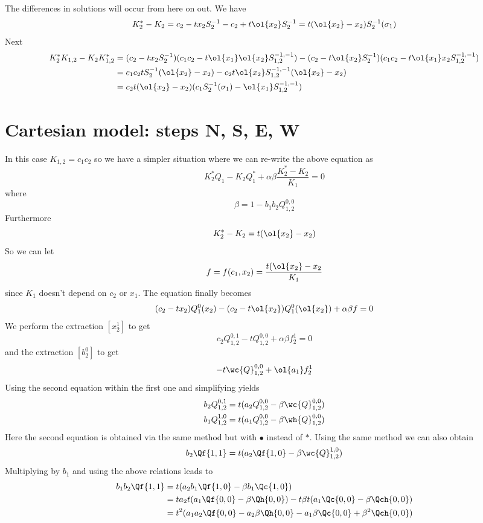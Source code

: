 The differences in solutions will occur from here on out. We have
\begin{align*}
	K_2^\ast - K_2 = c_2 - tx_2 S_2^{-1}-c_2+t\ol{x_2}S_2^{-1} = t(\ol{x_2}-x_2)S_2^{-1}(\sigma_1)
\end{align*}
Next
\begin{align*}
	K_2^\ast K_{1,2}- K_2 K_{1,2}^\ast &= (c_2-tx_2S_2^{-1})(c_1c_2-t\ol{x_1}\ol{x_2}S_{1,2}^{-1,-1})-(c_2-t\ol{x_2}S_2^{-1})(c_1c_2-t\ol{x_1}x_2S_{1,2}^{-1,-1})\\
	&=c_1c_2tS_2^{-1}(\ol{x_2}-x_2) - c_2t\ol{x_2}S_{1,2}^{-1,-1}(\ol{x_2}-x_2)\\
	&=c_2t(\ol{x_2}-x_2)(c_1S_2^{-1}(\sigma_1)-\ol{x_1}S_{1,2}^{-1,-1})
\end{align*}
\section{Cartesian model: steps N, S, E, W}
In this case $K_{1,2}= c_1c_2$ so we have a simpler situation where we can re-write the above equation as
\[
	K_2^\ast Q_1 - K_2 Q_1^\ast +\alpha\beta \frac{K_2^\ast - K_2}{K_1} = 0
\]
where
\[
	\beta = 1 - b_1b_2 Q_{1,2}^{0,0}
\]
Furthermore
\[
	K_2^\ast - K_2 = t(\ol{x_2}-x_2)
\]
So we can let
\[
	f = f(c_1,x_2) = \frac{t(\ol{x_2}-x_2}{K_1}
\]
since $K_1$ doesn't depend on $c_2$ or $x_1$. The equation finally becomes
\[
	(c_2-tx_2)Q_1^0(x_2) - (c_2-t\ol{x_2})Q_1^0(\ol{x_2}) + \alpha\beta f = 0
\]
We perform the extraction $[x_2^1]$ to get
\[
	c_2Q_{1,2}^{0,1}-t Q_{1,2}^{0,0} + \alpha \beta f_2^1 = 0
\]
and the extraction $[b_2^0]$ to get
\[
	- t \wc{Q}_{1,2}^{0,0} + \ol{a_1}f_2^1
\]
Using the second equation within the first one and simplifying yields
\begin{align*}
	b_2 Q_{1,2}^{0,1} &= t(a_2 Q_{1,2}^{0,0} - \beta \wc{Q}_{1,2}^{0,0})\\
	b_1 Q_{1,2}^{1,0} &= t(a_1 Q_{1,2}^{0,0} - \beta \wh{Q}_{1,2}^{0,0})
\end{align*}
Here the second equation is obtained via the same method but with $\bullet$ instead of $\ast$. Using the same method we can also obtain
\[
	b_2 \Qf{1,1} = t(a_2 \Qf{1,0}-\beta \wc{Q}_{1,2}^{1,0})
\]
Multiplying by $b_1$ and using the above relations leads to
\begin{align*}
	b_1b_2 \Qf{1,1} &= t(a_2b_1\Qf{1,0}-\beta b_1 \Qc{1,0})\\
			      &=t a_2t(a_1\Qf{0,0}-\beta \Qh{0,0})-t\beta t(a_1\Qc{0,0}-\beta\Qch{0,0})\\	
			      &=t^2(a_1a_2\Qf{0,0}-a_2\beta\Qh{0,0}-a_1\beta\Qc{0,0}+\beta^2\Qch{0,0})
\end{align*}
